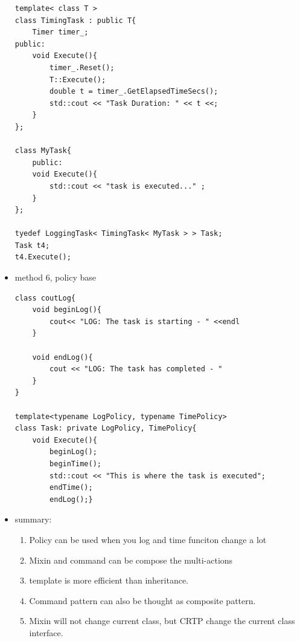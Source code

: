 \documentclass[a4paper,11pt,twoside]{book}
\begin{document}
\begin{itemize}
\begin{lstlisting}[numbers=none]
template< class T >
class TimingTask : public T{
	Timer timer_;
public:
	void Execute(){
		timer_.Reset();
		T::Execute();
		double t = timer_.GetElapsedTimeSecs();
		std::cout << "Task Duration: " << t <<;
	}
};
	
class MyTask{
	public:
	void Execute(){
		std::cout << "task is executed..." ;
	}
};
	
tyedef LoggingTask< TimingTask< MyTask > > Task;
Task t4;
t4.Execute();
\end{lstlisting}

		\item method 6, policy base
\begin{lstlisting}[numbers=none]
class coutLog{
	void beginLog(){
		cout<< "LOG: The task is starting - " <<endl
	}
	
	void endLog(){
		cout << "LOG: The task has completed - "
	}
}
	
template<typename LogPolicy, typename TimePolicy>
class Task: private LogPolicy, TimePolicy{
	void Execute(){
		beginLog();
		beginTime();
		std::cout << "This is where the task is executed";
		endTime();
		endLog();}
\end{lstlisting}
	
	\item summary:
	\begin{enumerate}
		\item Policy can be used when you log and time funciton change a lot
		\item Mixin and command can be compose the multi-actions
		\item template is more efficient than inheritance. 
		\item Command pattern can also be thought as composite pattern.
		\item Mixin will not change current class, but CRTP change the current class interface.
	\end{enumerate}
	
\end{itemize}
\end{document}
